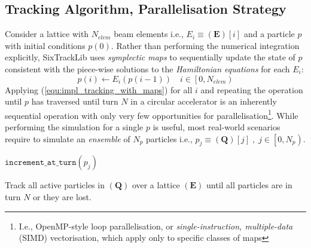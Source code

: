 \documentclass[a4paper,
               refpage,       %
               keeplastbox,   %
               ]{jacow}
\begin{document}
\subsection{Tracking Algorithm, Parallelisation Strategy}
Consider a lattice with $N_{elem}$ beam elements i.e., $E_i \equiv \left(\mathbf{E}\right)\left[i\right]$ and a particle $p$ with initial conditions $p\left(0\right)$. Rather than performing the numerical integration explicitly, SixTrackLib uses \textit{symplectic maps} to sequentially update the state of $p$ consistent with the piece-wise solutions to the \textit{Hamiltonian equations} for each $E_i$:
\begin{equation}
    \label{equ:impl_tracking_with_maps}
    p\left(i\right) \leftarrow E_i\left( p\left( i - 1 \right) \right) \quad i \in \left[0, N_{elem}\right)
\end{equation}
Applying (\ref{equ:impl_tracking_with_maps}) for all $i$ and repeating the operation until $p$ has traversed until turn $N$ in a circular accelerator is an inherently sequential operation with only very few opportunities for parallelisation\footnote{I.e.,  OpenMP-style loop parallelisation, or \textit{single-instruction, multiple-data} (SIMD) vectorisation, which apply only to specific classes of maps}. While performing the simulation for a single $p$ is useful, most real-world scenarios require to simulate an \textit{ensemble} of $N_{p}$ particles i.e., $p_j \equiv \left(\mathbf{Q}\right)\left[j\right]\;,\;j\in\left[0,N_{p}\right)$.
\begin{algorithm}[!hbt]
\begin{algorithmic}[1]
\label{alg1:line:loop_particles}
    \label{alg1:line:ref_p}
    \label{alg1:line:loop_turns} 
        \label{alg1:line:loop_lattice}
            \label{alg1:line:ref_elem}
            \label{alg1:line:apply_map}
            \label{alg1:line:is_lost_check}
            \EndIf
        \EndFor
        \label{alg1:line:is_lost_check2}
            \State $\texttt{increment\_at\_turn}(p_j)$\label{alg1:line:inc_turn}
        \EndIf
    \EndWhile
\EndFor
\EndProcedure
\end{algorithmic}
\caption{Track all active particles in $\left(\mathbf{Q}\right)$ over a lattice $\left(\mathbf{E}\right)$ until all particles are in turn $N$ or they are lost.}
\label{alg:track_until_turn}
\end{algorithm}
\end{document}
